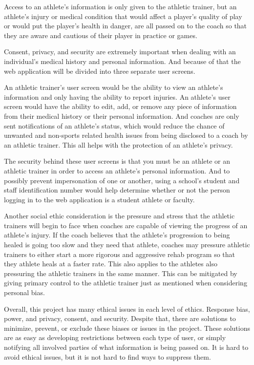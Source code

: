 \documentclass[10pt,twocolumn]{article}
\begin{document}
Access to an athlete's information is only given to the athletic trainer, but an athlete's injury or medical condition that would affect a player's quality of play or would put the player's health in danger, are all passed on to the coach so that they are aware and cautious of their player in practice or games.

Consent, privacy, and security are extremely important when dealing with an individual's medical history and personal information. And because of that the web application will be divided into three separate user screens. 

An athletic trainer's user screen would be the ability to view an athlete's information and only having the ability to report injuries. An athlete's user screen would have the ability to edit, add, or remove any piece of information from their medical history or their personal information. And coaches are only sent notifications of an athlete's status, which would reduce the chance of unwanted and non-sports related health issues from being disclosed to a coach by an athletic trainer. This all helps with the protection of an athlete's privacy. 

The security behind these user screens is that you must be an athlete or an athletic trainer in order to access an athlete's personal information. And to possibly prevent impersonation of one or another, using a school's student and staff identification number would help determine whether or not the person logging in to the web application is a student athlete or faculty. 

Another social ethic consideration is the pressure and stress that the athletic trainers will begin to face when coaches are capable of viewing the progress of an athlete's injury\cite{atrole}. If the coach believes that the athlete's progression to being healed is going too slow and they need that athlete, coaches may pressure athletic trainers to either start a more rigorous and aggressive rehab program so that they athlete heals at a faster rate. This also applies to the athletes also pressuring the athletic trainers in the same manner. This can be mitigated by giving primary control to the athletic trainer just as mentioned when considering personal bias.

Overall, this project has many ethical issues in each level of ethics. Response bias, power, and privacy, consent, and security. Despite that, there are solutions to minimize, prevent, or exclude these biases or issues in the project. These solutions are as easy as developing restrictions between each type of user, or simply notifying all involved parties of what information is being passed on. It is hard to avoid ethical issues, but it is not hard to find ways to suppress them.
\end{document}
